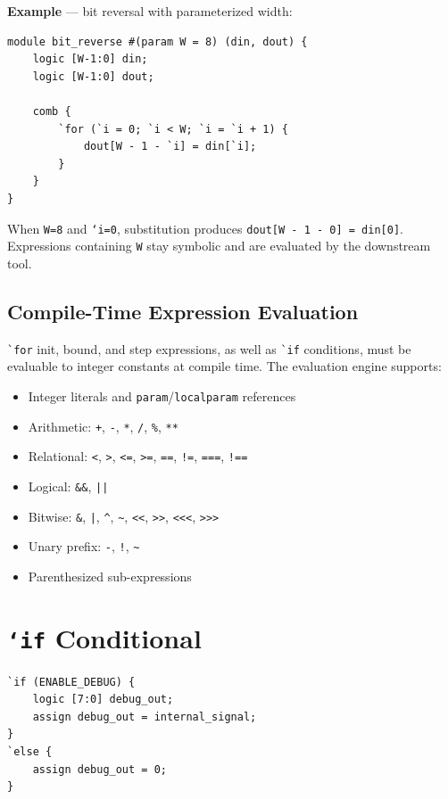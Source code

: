 \documentclass[lang=en,11pt]{elegantbook}
\newcommand{\code}[1]{\texttt{#1}}
\newcommand{\slipinline}[1]{\lstinline[language=Slip]|#1|}
\begin{document}
\textbf{Example} --- bit reversal with parameterized width:

\begin{lstlisting}[language=Slip]
module bit_reverse #(param W = 8) (din, dout) {
    logic [W-1:0] din;
    logic [W-1:0] dout;

    comb {
        `for (`i = 0; `i < W; `i = `i + 1) {
            dout[W - 1 - `i] = din[`i];
        }
    }
}
\end{lstlisting}

When \code{W=8} and \code{`i=0}, substitution produces \code{dout[W - 1 - 0] = din[0]}. Expressions containing \code{W} stay symbolic and are evaluated by the downstream tool.

\subsection{Compile-Time Expression Evaluation}

\slipinline{`for} init, bound, and step expressions, as well as \slipinline{`if} conditions, must be evaluable to integer constants at compile time. The evaluation engine supports:

\begin{itemize}
  \item Integer literals and \code{param}/\code{localparam} references
  \item Arithmetic: \code{+}, \code{-}, \code{*}, \code{/}, \code{\%}, \code{**}
  \item Relational: \code{<}, \code{>}, \code{<=}, \code{>=}, \code{==}, \code{!=}, \code{===}, \code{!==}
  \item Logical: \code{\&\&}, \code{||}
  \item Bitwise: \code{\&}, \code{|}, \code{\^}, \code{\~}, \code{<<}, \code{>>}, \code{<<<}, \code{>>>}
  \item Unary prefix: \code{-}, \code{!}, \code{\~}
  \item Parenthesized sub-expressions
\end{itemize}

\section{\texorpdfstring{\code{`if}}{`if} Conditional}

\begin{lstlisting}[language=Slip]
`if (ENABLE_DEBUG) {
    logic [7:0] debug_out;
    assign debug_out = internal_signal;
}
`else {
    assign debug_out = 0;
}
\end{lstlisting}
\end{document}
